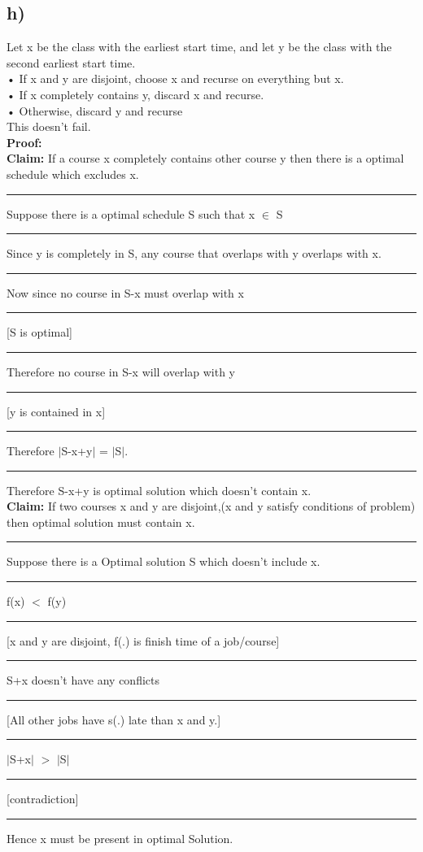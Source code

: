 \documentclass{report}
\begin{document}
 \subsection*{h)}
 Let x be the class with the earliest start time, and let y be the class with the second earliest start time.\\
• If x and y are disjoint, choose x and recurse on everything but x.\\
• If x completely contains y, discard x and recurse.\\
• Otherwise, discard y and recurse\\
This doesn't fail.\\
\textbf{Proof:}\\
\textbf{Claim:} If a course x completely contains other course y then there is a optimal schedule which excludes x.\\
\noindent\rule[0.5mm]{1cm}{0pt} Suppose there is a optimal schedule S such that x $\in$ S\\
\noindent\rule[0.5mm]{1cm}{0pt} Since y is completely in S, any course that overlaps with y overlaps with x.\\
\noindent\rule[0.5mm]{1cm}{0pt} Now since no course in S-x must overlap with x \noindent\rule[0.5mm]{1cm}{0pt} [S is optimal]\\
\noindent\rule[0.5mm]{1cm}{0pt} Therefore no course in S-x will overlap with y \noindent\rule[0.5mm]{1cm}{0pt} [y is contained in x]\\
\noindent\rule[0.5mm]{1cm}{0pt} Therefore $|$S-x+y$|$ = $|$S$|$.\\
\noindent\rule[0.5mm]{1cm}{0pt} Therefore S-x+y is optimal solution which doesn't contain x.\\
\textbf{Claim:} If two courses x and y are disjoint,(x and y satisfy conditions of problem) then optimal solution must contain x.\\
\noindent\rule[0.5mm]{1cm}{0pt} Suppose there is a Optimal solution S which doesn't include x.\\
\noindent\rule[0.5mm]{1cm}{0pt} f(x) $<$ f(y) \noindent\rule[0.5mm]{1cm}{0pt} [x and y are disjoint, f(.) is finish time of a job/course]\\
\noindent\rule[0.5mm]{1cm}{0pt} S+x doesn't have any conflicts \noindent\rule[0.5mm]{1cm}{0pt}[All other jobs have s(.) late than x and y.]\\
\noindent\rule[0.5mm]{1cm}{0pt} $|$S+x$|$ $>$ $|$S$|$\noindent\rule[0.5mm]{1cm}{0pt} [contradiction]\\
\noindent\rule[0.5mm]{1cm}{0pt} Hence x must be present in optimal Solution.\\
\end{document}
